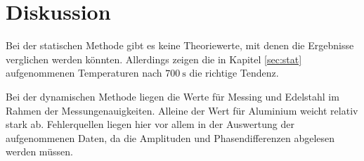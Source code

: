 \section{Diskussion}

Bei der statischen Methode gibt es keine Theoriewerte, mit denen die Ergebnisse verglichen werden könnten.
Allerdings zeigen die in Kapitel \ref{sec:stat} aufgenommenen Temperaturen nach $\SI{700}{\s}$ die
richtige Tendenz.

Bei der dynamischen Methode liegen die Werte für Messing und Edelstahl im Rahmen der Messungenauigkeiten.
Alleine der Wert für Aluminium weicht relativ stark ab.
Fehlerquellen liegen hier vor allem in der Auswertung der aufgenommenen Daten, da die Amplituden und
Phasendifferenzen abgelesen werden müssen.
